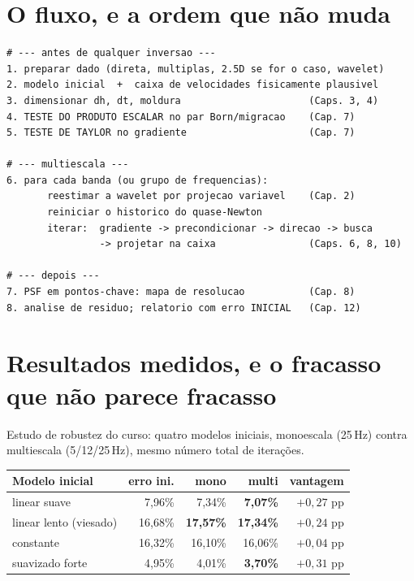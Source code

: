 \documentclass[11pt,a4paper,oneside]{report}
\begin{document}
\section{O fluxo, e a ordem que n\~ao muda}

\begin{lstlisting}
# --- antes de qualquer inversao ---
1. preparar dado (direta, multiplas, 2.5D se for o caso, wavelet)
2. modelo inicial  +  caixa de velocidades fisicamente plausivel
3. dimensionar dh, dt, moldura                      (Caps. 3, 4)
4. TESTE DO PRODUTO ESCALAR no par Born/migracao    (Cap. 7)
5. TESTE DE TAYLOR no gradiente                     (Cap. 7)

# --- multiescala ---
6. para cada banda (ou grupo de frequencias):
       reestimar a wavelet por projecao variavel    (Cap. 2)
       reiniciar o historico do quase-Newton
       iterar:  gradiente -> precondicionar -> direcao -> busca
                -> projetar na caixa                (Caps. 6, 8, 10)

# --- depois ---
7. PSF em pontos-chave: mapa de resolucao           (Cap. 8)
8. analise de residuo; relatorio com erro INICIAL   (Cap. 12)
\end{lstlisting}

\section{Resultados medidos, e o fracasso que n\~ao parece fracasso}

Estudo de robustez do curso: quatro modelos iniciais, monoescala (25\,Hz)
contra multiescala (5/12/25\,Hz), mesmo n\'umero total de itera\c{c}\~oes.

\begin{center}
\begin{tabular}{@{}lrrrr@{}}
\toprule
\textbf{Modelo inicial} & \textbf{erro ini.} & \textbf{mono} & \textbf{multi}
& \textbf{vantagem} \\
\midrule
linear suave           & 7{,}96\%  & 7{,}34\%  & \textbf{7{,}07\%}  & $+0{,}27$ pp \\
linear lento (viesado) & 16{,}68\% & \textbf{17{,}57\%} & \textbf{17{,}34\%} & $+0{,}24$ pp \\
constante              & 16{,}32\% & 16{,}10\% & 16{,}06\% & $+0{,}04$ pp \\
suavizado forte        & 4{,}95\%  & 4{,}01\%  & \textbf{3{,}70\%}  & $+0{,}31$ pp \\
\bottomrule
\end{tabular}
\end{center}
\end{document}
